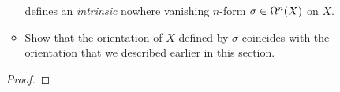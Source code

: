 \documentclass[../psets.tex]{subfiles}
\begin{document}
\begin{enumerate}[label={\textbf{4.4.\roman*.}}]
\begin{itemize}[label={\scriptsize$\blacktriangleright$}]
\begin{equation*}
        \end{equation*}
        defines an \emph{intrinsic} nowhere vanishing $n$-form $\sigma\in\ome[n]{X}$ on $X$.
        \item Show that the orientation of $X$ defined by $\sigma$ coincides with the orientation that we described earlier in this section.
    \end{itemize}
    \begin{proof}





\end{proof}
\end{enumerate}
\end{document}

